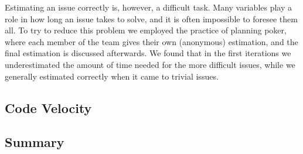 Estimating an issue correctly is, however, a difficult task.
Many variables play a role in how long an issue takes to solve, and it is often impossible to foresee them all.
To try to reduce this problem we employed the practice of planning poker, where each member of the team gives their own (anonymous) estimation, and the final estimation is discussed afterwards.
We found that in the first iterations we underestimated the amount of time needed for the more difficult issues, while we generally estimated correctly when it came to trivial issues.

\subsection{Code Velocity}

\subsection{Summary}
